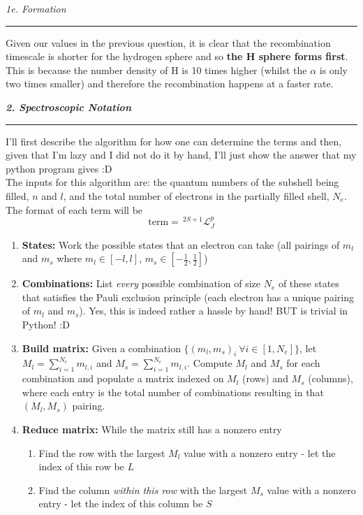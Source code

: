 \documentclass[12pt, letterpaper, twoside]{article}
\newcommand{\question}[1]{{\noindent \it #1}}
\newcommand{\answer}[1]{
    \par\noindent\rule{\textwidth}{0.4pt}#1\vspace{0.5cm}
}
\begin{document}
\question{1e. Formation}
\answer{
    Given our values in the previous question, it is clear that the recombination timescale is shorter for the hydrogen sphere and so \textbf{the H sphere forms first}. This is because the number density of H is 10 times higher (whilst the $\alpha$ is only two times smaller) and therefore the recombination happens at a faster rate.
}

\clearpage

\question{\textbf{2. Spectroscopic Notation}}

\answer{
    I'll first describe the algorithm for how one can determine the terms and then, given that I'm lazy and I did not do it by hand, I'll just show the answer that my python program gives :D\\

    \noindent The inputs for this algorithm are: the quantum numbers of the subshell being filled, $n$ and $l$, and the total number of electrons in the partially filled shell, $N_e$. The format of each term will be
    \begin{equation}
        \mathrm{term} = \,^{2 S + 1}\mathcal{L}_{J}^p
    \end{equation}
    \begin{enumerate}
        \item \textbf{States:} Work the possible states that an electron can take (all pairings of $m_l$ and $m_s$ where $m_l \in [-l, l]$, $m_s \in [-\frac{1}{2}, \frac{1}{2}]$)
        \item \textbf{Combinations:} List \textit{every} possible combination of size $N_e$ of these states that satisfies the Pauli exclusion principle (each electron has a unique pairing of $m_l$ and $m_s$). Yes, this is indeed rather a hassle by hand! BUT is trivial in Python! :D
        \item \textbf{Build matrix:} Given a combination $\{(m_l, m_s)_i \ \forall i \in [1, N_e]\}$, let $M_l = \sum_{i = 1}^{N_e} m_{l, i}$ and $M_s = \sum_{i = 1}^{N_e} m_{l, i}$. Compute $M_l$ and $M_s$ for each combination and populate a matrix indexed on $M_l$ (rows) and $M_s$ (columns), where each entry is the total number of combinations resulting in that $(M_l, M_s)$ pairing.
        \item \textbf{Reduce matrix:} While the matrix still has a nonzero entry
        \begin{enumerate}
            \item Find the row with the largest $M_l$ value with a nonzero entry - let the index of this row be $L$
            \item Find the column \textit{within this row} with the largest $M_s$ value with a nonzero entry - let the index of this column be $S$

\end{enumerate}
\end{enumerate}}
\end{document}
